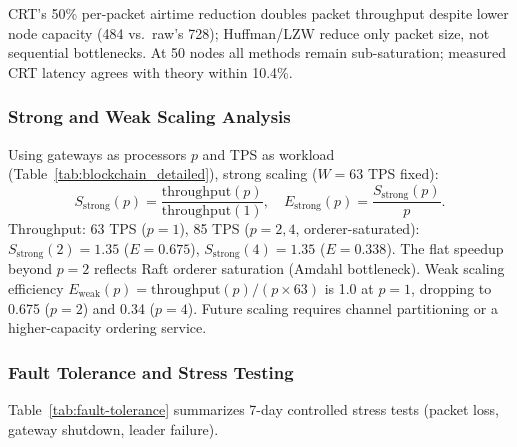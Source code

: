 \documentclass[pdflatex,sn-mathphys-num]{sn-jnl}
\theoremstyle{thmstyleone}
\theoremstyle{thmstyletwo}
\theoremstyle{thmstylethree}
\begin{document}
CRT’s 50\% per-packet airtime reduction doubles packet throughput despite lower node capacity (484 vs.\ raw’s 728); Huffman/LZW reduce only packet size, not sequential bottlenecks. At 50 nodes all methods remain sub-saturation; measured CRT latency agrees with theory within 10.4\%.

\subsubsection{Strong and Weak Scaling Analysis}
\label{subsubsec:scaling_analysis}

Using gateways as processors $p$ and TPS as workload (Table~\ref{tab:blockchain_detailed}), strong scaling ($W=63$ TPS fixed):
\begin{equation}
S_{\text{strong}}(p) = \frac{\text{throughput}(p)}{\text{throughput}(1)}, \quad E_{\text{strong}}(p) = \frac{S_{\text{strong}}(p)}{p}.
\end{equation}
Throughput: 63 TPS ($p=1$), 85 TPS ($p=2,4$, orderer-saturated): $S_{\text{strong}}(2)=1.35$ ($E=0.675$), $S_{\text{strong}}(4)=1.35$ ($E=0.338$). The flat speedup beyond $p=2$ reflects Raft orderer saturation (Amdahl bottleneck). Weak scaling efficiency $E_{\text{weak}}(p)=\text{throughput}(p)/(p\times63)$ is 1.0 at $p=1$, dropping to 0.675 ($p=2$) and 0.34 ($p=4$). Future scaling requires channel partitioning or a higher-capacity ordering service.

\subsubsection{Fault Tolerance and Stress Testing}
\label{subsubsec:fault_tolerance}

Table~\ref{tab:fault-tolerance} summarizes 7-day controlled stress tests (packet loss, gateway shutdown, leader failure).
\end{document}
